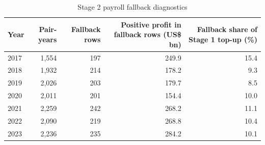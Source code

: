 \begin{table}[H]
\centering
\footnotesize
\setlength{\tabcolsep}{3pt}
\caption{Stage 2 payroll fallback diagnostics}
\label{tab:app_stage2_payroll_fallback}
\begin{tabular}{@{}lrrrr@{}}
\toprule
Year & Pair-years & Fallback rows & Positive profit in fallback rows (US\$ bn) & Fallback share of Stage 1 top-up (\%) \\
\midrule
2017 & 1,554 & 197 & 249.9 & 15.4 \\
2018 & 1,932 & 214 & 178.2 &  9.3 \\
2019 & 2,026 & 203 & 179.7 &  8.5 \\
2020 & 2,011 & 201 & 154.4 & 10.0 \\
2021 & 2,259 & 242 & 268.2 & 11.1 \\
2022 & 2,090 & 219 & 268.8 & 10.4 \\
2023 & 2,236 & 235 & 284.2 & 10.1 \\
\bottomrule
\end{tabular}
\end{table}
